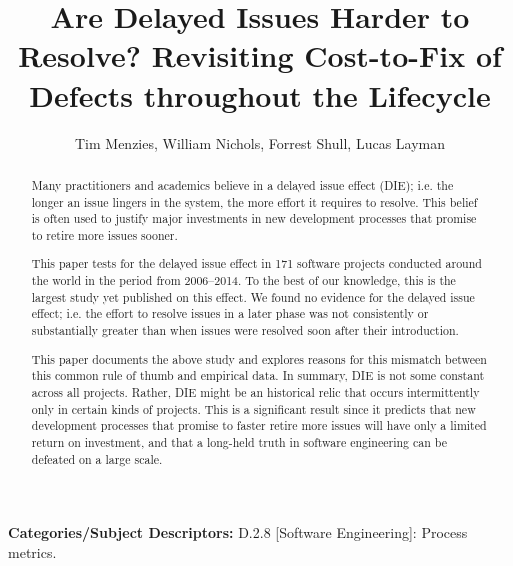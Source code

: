 \documentclass[smallcondensed]{svjour3}
\begin{document}
\date{}
 \title{Are Delayed Issues Harder to Resolve? Revisiting Cost-to-Fix of Defects throughout the Lifecycle}
 
 \author{Tim Menzies, William Nichols, Forrest Shull, Lucas Layman}
 
\maketitle
\begin{abstract}
Many  practitioners and academics
believe in a delayed issue effect (DIE); i.e.
 the longer an issue lingers in the system, the more effort it requires to resolve.
This belief
is often  used to justify 
major investments in  new development
processes that promise to retire more issues sooner.

This paper tests for the delayed issue effect in
171 software projects conducted around the world in the period from 2006--2014.
To the best of our knowledge,  this is the largest study
yet published on this effect.
We found no evidence for the  delayed issue effect; i.e.
the  effort  to resolve 
issues in a later phase was not consistently or substantially greater than  
when  issues were resolved soon after their introduction. 

This paper documents the above study and explores reasons for this  mismatch between this common rule of thumb and empirical data.
In  summary, DIE is not some constant across all projects. Rather, DIE might
be an historical relic that  occurs intermittently 
only in  certain kinds of projects.  This is a significant result since it predicts that  new development
processes that promise to faster retire more issues will have only a  limited return on investment, and that a long-held truth in software engineering can be defeated on a large scale. 
\end{abstract}

 \vspace{1mm}
\noindent
{\bf Categories/Subject Descriptors:} 
D.2.8 [Software Engineering]: Process metrics.

 
\end{document}
